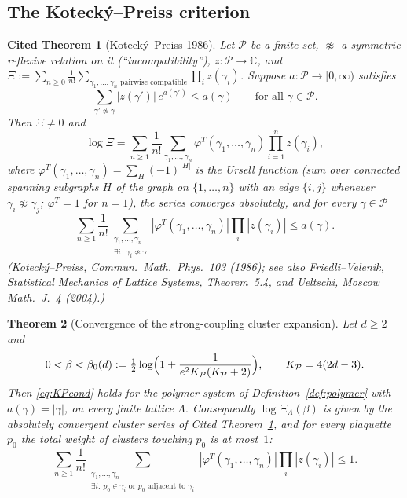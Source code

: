 \documentclass[11pt,a4paper]{article}
\newtheorem{theorem}{Theorem}[section]
\newtheorem{citedtheorem}[theorem]{Cited Theorem}
\theoremstyle{definition}
\theoremstyle{remark}
\newcommand{\C}{\mathbb{C}}
\newcommand{\cP}{\mathcal{P}}
\begin{document}
\subsection{The Kotecký--Preiss criterion}

\begin{citedtheorem}[Kotecký--Preiss 1986]\label{thm:KP}
Let $\mathcal P$ be a finite set, $\not\approx$ a symmetric reflexive relation on it (``incompatibility''), $z:\mathcal P\to\C$,
and $\Xi:=\sum_{n\ge0}\frac1{n!}\sum_{\gamma_1,\dots,\gamma_n\text{ pairwise compatible}}\prod_iz(\gamma_i)$. Suppose
$a:\mathcal P\to[0,\infty)$ satisfies
\begin{equation}\label{eq:KPcond}
\sum_{\gamma'\not\approx\gamma}|z(\gamma')|\,e^{a(\gamma')}\le a(\gamma)\qquad\text{for all }\gamma\in\mathcal P .
\end{equation}
Then $\Xi\neq0$ and
\[
\log\Xi=\sum_{n\ge1}\frac1{n!}\sum_{\gamma_1,\dots,\gamma_n}\varphi^T(\gamma_1,\dots,\gamma_n)\prod_{i=1}^nz(\gamma_i),
\]
where $\varphi^T(\gamma_1,\dots,\gamma_n)=\sum_{H}(-1)^{|H|}$ is the Ursell function (sum over connected spanning subgraphs
$H$ of the graph on $\{1,\dots,n\}$ with an edge $\{i,j\}$ whenever $\gamma_i\not\approx\gamma_j$; $\varphi^T=1$ for $n=1$), the
series converges absolutely, and for every $\gamma\in\mathcal P$
\[
\sum_{n\ge1}\frac1{n!}\sum_{\substack{\gamma_1,\dots,\gamma_n\\ \exists i:\ \gamma_i\not\approx\gamma}}
|\varphi^T(\gamma_1,\dots,\gamma_n)|\prod_i|z(\gamma_i)|\le a(\gamma).
\]
(Kotecký--Preiss, Commun.\ Math.\ Phys.\ 103 (1986); see also Friedli--Velenik, \emph{Statistical Mechanics of Lattice
Systems}, Theorem~5.4, and Ueltschi, Moscow Math.\ J.\ 4 (2004).)
\end{citedtheorem}

\begin{theorem}[Convergence of the strong-coupling cluster expansion]\label{thm:conv}
Let $d\ge2$ and
\[
0<\beta<\beta_0(d):=\tfrac12\log\Bigl(1+\frac1{e^2K_\cP(K_\cP+2)}\Bigr),\qquad K_\cP=4(2d-3).
\]
Then \eqref{eq:KPcond} holds for the polymer system of Definition~\ref{def:polymer} with $a(\gamma)=|\gamma|$, on every
finite lattice $\Lambda$. Consequently $\log\Xi_\Lambda(\beta)$ is given by the absolutely convergent cluster series of
Cited Theorem~\ref{thm:KP}, and for every plaquette $p_0$ the total weight of clusters touching $p_0$ is at most~$1$:
\[
\sum_{n\ge1}\frac1{n!}\sum_{\substack{\gamma_1,\dots,\gamma_n\\ \exists i:\ p_0\in\gamma_i\text{ or }p_0\text{ adjacent to }\gamma_i}}
|\varphi^T(\gamma_1,\dots,\gamma_n)|\prod_i|z(\gamma_i)|\le1 .
\]
\end{theorem}
\end{document}
